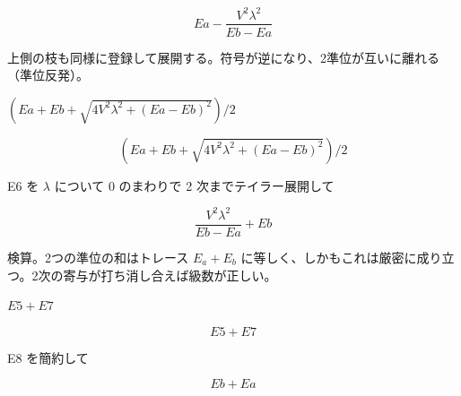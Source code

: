 \documentclass[dvipdfmx,a4paper,11pt]{jsarticle}
\begin{document}
\begin{equation}
  Ea-\frac{V^2 \lambda^2}{Eb-Ea}
  \label{eq:E5}
\end{equation}

上側の枝も同様に登録して展開する。符号が逆になり、2準位が互いに離れる（準位反発）。

$(Ea + Eb + \sqrt{4 V^2 \lambda^2 + (Ea-Eb)^2})/2$

\begin{equation}
  (Ea + Eb + \sqrt{4 V^2 \lambda^2 + (Ea-Eb)^2})/2
  \label{eq:E6}
\end{equation}

E6 を $\lambda$ について 0 のまわりで 2 次までテイラー展開して

\begin{equation}
  \frac{V^2 \lambda^2}{Eb-Ea}+Eb
  \label{eq:E7}
\end{equation}

検算。2つの準位の和はトレース $E_a+E_b$ に等しく、しかもこれは厳密に成り立つ。2次の寄与が打ち消し合えば級数が正しい。

$E5 + E7$

\begin{equation}
  E5 + E7
  \label{eq:E8}
\end{equation}

E8 を簡約して

\begin{equation}
  Eb+Ea
  \label{eq:E9}
\end{equation}
\end{document}
